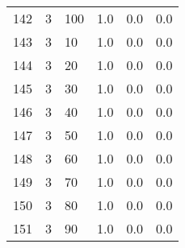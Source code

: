 \documentclass{article}
\begin{document}
{\begin{tabular}{llllll}
142 &         3 &        100 &              1.0 &                       0.0 &                                   0.0 \\
143 &         3 &         10 &              1.0 &                       0.0 &                                   0.0 \\
144 &         3 &         20 &              1.0 &                       0.0 &                                   0.0 \\
145 &         3 &         30 &              1.0 &                       0.0 &                                   0.0 \\
146 &         3 &         40 &              1.0 &                       0.0 &                                   0.0 \\
147 &         3 &         50 &              1.0 &                       0.0 &                                   0.0 \\
148 &         3 &         60 &              1.0 &                       0.0 &                                   0.0 \\
149 &         3 &         70 &              1.0 &                       0.0 &                                   0.0 \\
150 &         3 &         80 &              1.0 &                       0.0 &                                   0.0 \\
151 &         3 &         90 &              1.0 &                       0.0 &                                   0.0 \\
\bottomrule
\end{tabular}
}
\newpage
\end{document}
